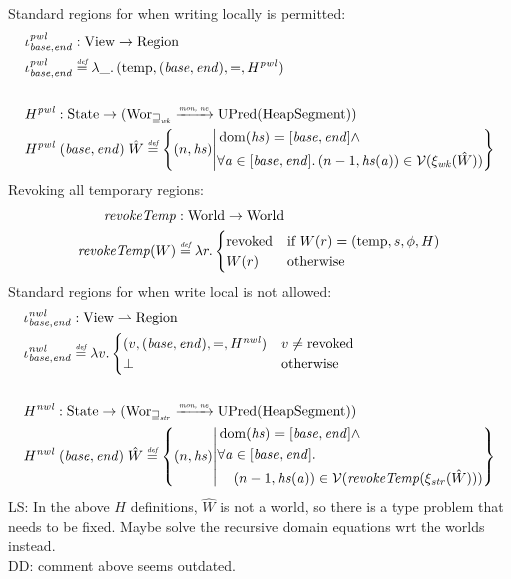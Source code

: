 \documentclass[a4paper]{article}
\newcommand{\parfun}{\rightharpoonup}
\newcommand{\monnefun}{\xrightarrow{\textit{\tiny{mon, ne}}}}
\newcommand{\fun}{\rightarrow}
\newcommand{\defeq}{\stackrel{\textit{\tiny{def}}}{=}}
\DeclareMathOperator{\dom}{dom}
\newcommand\lau[1]{{\color{purple} \sf \footnotesize {LS: #1}}\\}
\newcommand\dominique[1]{{\color{purple} \sf \footnotesize {DD: #1}}\\}
\newcommand{\var}[1]{\mathit{#1}}
\newcommand{\hs}{\var{hs}}
\newcommand{\addr}{\var{a}}
\newcommand{\start}{\var{base}}
\newcommand{\addrend}{\var{end}}
\newcommand{\plainfun}[2]{
  \ifthenelse{\equal{#2}{}}
             {\mathit{#1}}
             {\mathit{#1}(#2)}
}
\newcommand{\revokeTemp}[1]{\plainfun{revokeTemp}{#1}}
\newcommand{\futurewk}{\mathbin{\sqsupseteq}_{\var{wk}}}
\newcommand{\futurestr}{\mathbin{\sqsupseteq}_{\var{str}}}
\newcommand{\asmType}{\plaindom{AsmType}}
\newcommand{\plaindom}[1]{\mathrm{#1}}
\newcommand{\HeapSegments}{\plaindom{HeapSegment}}
\newcommand{\States}{\plaindom{State}}
\newcommand{\Regions}{\plaindom{Region}}
\newcommand{\Worlds}{\plaindom{World}}
\newcommand{\Wor}{\plaindom{Wor}}
\newcommand{\Worwk}{\Wor_{\futurewk}}
\newcommand{\Worstr}{\Wor_{\futurestr}}
\newcommand{\xistr}{\xi_{\var{str}}}
\newcommand{\UPred}[1]{\plaindom{UPred}(#1)}
\newcommand{\Views}{\plaindom{View}}
\newcommand{\intr}[2]{\mathcal{#1}}
\newcommand{\valueintr}[1]{\intr{V}{#1}}
\newcommand{\stdvr}{\valueintr{\asmType}}
\newcommand{\npair}[2][n]{\left(#1,#2 \right)}
\newcommand{\plainview}[1]{\mathrm{#1}}
\newcommand{\temp}{\plainview{temp}}
\newcommand{\revoked}{\plainview{revoked}}
\begin{document}
Standard regions for when writing locally is permitted:
\begin{align*}
  &\iota_{\start,\addrend}^{\var{pwl}} : \Views \fun \Regions\\
  &\iota_{\start,\addrend}^{\var{pwl}} \defeq \lambda \_ \ldotp(\temp,(\start,\addrend),=,H^{\var{pwl}}) \\ \\
  &H^{\var{pwl}} : \States \fun (\Worwk \monnefun \UPred{\HeapSegments})\\
  &H^{\var{pwl}} \; (\start,\addrend) \; \hat{W} \defeq \left\{\npair{\hs} \middle|
    \begin{aligned}
      &\dom(\hs) = [\start,\addrend] \land \\
      &\forall \addr \in [\start,\addrend] \ldotp \npair[n-1]{\hs(\addr)} \in \stdvr(\xi_{\var{wk}}(\hat{W}))
    \end{aligned}
  \right\}
\end{align*}
Revoking all temporary regions:
\begin{align*}
  \revokeTemp{} & : \Worlds \fun \Worlds \\
  \revokeTemp{W} & \defeq \lambda r \ldotp 
                   \begin{cases}
                     \revoked            & \text{if }W(r) = (\temp,s,\phi,H) \\
                     W(r)                & \text{otherwise}
                   \end{cases}
\end{align*}
Standard regions for when write local is not allowed:
\begin{align*}
  &\iota_{\start,\addrend}^{\var{nwl}} : \Views \parfun \Regions \\
  &\iota_{\start,\addrend}^{\var{nwl}} \defeq \lambda v \ldotp
    \begin{cases}
      (v,(\start,\addrend),=,H^{\var{nwl}}) & v \neq \revoked \\
      \bot & \text{otherwise}
\end{cases}
\\ \\
  &H^{\var{nwl}} : \States \fun (\Worstr \monnefun \UPred{\HeapSegments})\\
  &H^{\var{nwl}} \; (\start,\addrend) \;\hat{W} \defeq \left\{\npair{\hs} \middle|
    \begin{aligned}
      &\dom(\hs) = [\start,\addrend] \land \\
      &\forall \addr \in [\start,\addrend] \ldotp \\
      &\quad \npair[n-1]{\hs(\addr)} \in \stdvr(\revokeTemp{\xistr(\hat{W})})
    \end{aligned}
  \right\}
\end{align*}
\lau{In the above $H$ definitions, $\hat{W}$ is not a world, so there is a type problem that needs to be fixed. Maybe solve the recursive domain equations wrt the worlds instead.} 
\dominique{comment above seems outdated.}
\end{document}
